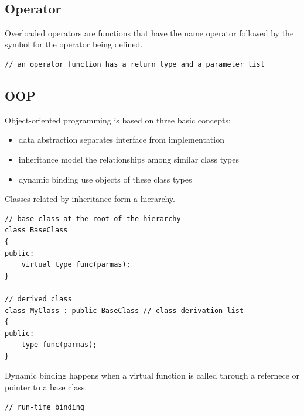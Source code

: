 \documentclass{blog}
\begin{document}
\begin{definition}~
    \begin{verbatim}
\end{verbatim}
\end{definition}

\subsection{Operator}
\begin{definition}
    Overloaded operators are functions that have the name operator
    followed by the symbol for the operator being defined.
    \begin{verbatim}
// an operator function has a return type and a parameter list
\end{verbatim}
\end{definition}

\subsection{OOP}
\begin{definition}[OOP]
    Object-oriented programming is based on three basic concepts:
    \begin{itemize}
        \item data abstraction separates interface from implementation
        \item inheritance model the relationships among similar class types
        \item dynamic binding use objects of these class types
    \end{itemize}
\end{definition}

\begin{definition}[inheritance]
    Classes related by inheritance form a hierarchy.
    \begin{verbatim}
// base class at the root of the hierarchy
class BaseClass
{
public:
    virtual type func(parmas);
}

// derived class
class MyClass : public BaseClass // class derivation list
{
public:
    type func(parmas);
}
\end{verbatim}
\end{definition}

\begin{definition}
    Dynamic binding happens when a virtual function is called through
    a refernece or pointer to a base class.
    \begin{verbatim}
// run-time binding
\end{verbatim}
\end{definition}
\end{document}
